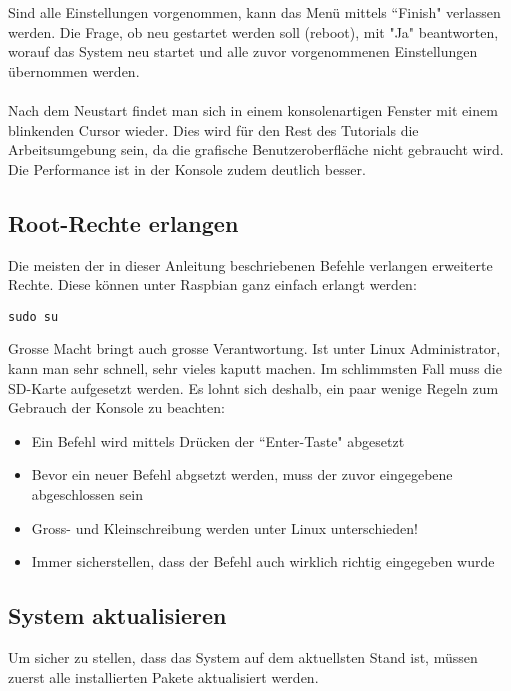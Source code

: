 Sind alle Einstellungen vorgenommen, kann das Menü mittels ``Finish" verlassen werden. Die Frage, ob neu gestartet werden soll (reboot), mit "Ja" beantworten, worauf das System neu startet und alle zuvor vorgenommenen Einstellungen übernommen werden.
\\
\\
Nach dem Neustart findet man sich in einem konsolenartigen Fenster mit einem blinkenden Cursor wieder. Dies wird für den Rest des Tutorials die Arbeitsumgebung sein, da die grafische Benutzeroberfläche nicht gebraucht wird. Die Performance ist in der Konsole zudem deutlich besser.


\subsection{Root-Rechte erlangen}
Die meisten der in dieser Anleitung beschriebenen Befehle verlangen erweiterte Rechte. Diese können unter Raspbian ganz einfach erlangt werden:
\\

\begin{lstlisting}
sudo su
\end{lstlisting}


Grosse Macht bringt auch grosse Verantwortung. Ist unter Linux Administrator, kann man sehr schnell, sehr vieles kaputt machen. Im schlimmsten Fall muss die SD-Karte aufgesetzt werden. Es lohnt sich deshalb, ein paar wenige Regeln zum Gebrauch der Konsole zu beachten: 

\begin{itemize}
\item Ein Befehl wird mittels Drücken der ``Enter-Taste" abgesetzt
\item Bevor ein neuer Befehl abgsetzt werden, muss der zuvor eingegebene abgeschlossen sein
\item Gross- und Kleinschreibung werden unter Linux unterschieden!
\item Immer sicherstellen, dass der Befehl auch wirklich richtig eingegeben wurde
\end{itemize}

\subsection{System aktualisieren}
Um sicher zu stellen, dass das System auf dem aktuellsten Stand ist, müssen zuerst alle installierten Pakete aktualisiert werden.
\\

